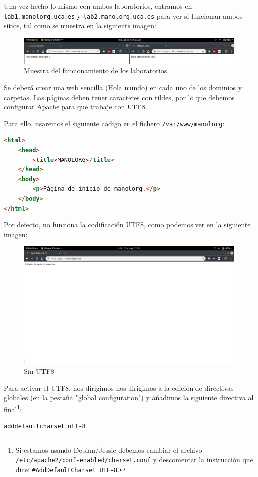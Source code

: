 \documentclass[12pt,letterpaper]{article}
\begin{document}
\begin{itemize}
	Una vez hecho lo mismo con ambos laboratorios, entramos en \texttt{lab1.manolorg.uca.es} y \texttt{lab2.manolorg.uca.es} para ver si funcionan ambos sitios, tal como se muestra en la siguiente imagen:
	\begin{figure}[h]
		\centering
		\includegraphics[scale=0.34]{FuncionanLabs.png}
		\caption{Muestra del funcionamiento de los laboratorios.}
		\label{Muestra del funcionamiento de los laboratorios}
	\end{figure}
\end{itemize}

Se deberá crear una web sencilla (Hola mundo) en cada uno de los dominios y carpetas. Las páginas deben tener caracteres con tildes, por lo que debemos configurar Apache para que trabaje con UTF8.

Para ello, usaremos el siguiente código en el fichero \texttt{/var/www/manolorg}:
\begin{lstlisting}[language=html]
<html>
	<head>
		<title>MANOLORG</title>
	</head>
	<body>
		<p>Página de inicio de manolorg.</p>
	</body>
</html>
\end{lstlisting}

\newpage
Por defecto, no funciona la codificación UTF8, como podemos ver en la siguiente imagen:
\begin{figure}[h]
	\centering
	\includegraphics[scale=0.34]{SinUTF8.png}
	\caption{Sin UTF8}
	\label{Sin UTF8}
\end{figure}

Para activar el UTF8, nos dirigimos nos dirigimos a la edición de directivas globales (en la pestaña "global configuration") y añadimos la siguiente directiva al final\footnote{Si estamos usando Debian/Jessie debemos cambiar el archivo \texttt{/etc/apache2/conf-enabled/charset.conf} y descomentar la instrucción que dice: \texttt{\#AddDefaultCharset UTF-8}.}:
\begin{center}
	\texttt{adddefaultcharset utf-8}
\end{center}
\end{document}
